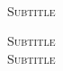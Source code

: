 \begin{center}

  \textsc{\LARGE \pdfTitle}\\[0.1cm]
  \HRule\\[0.25cm]
  \textsc{\Large \pdfAuthor}\\[0.2cm]

  \textsc{\large Subtitle}
  
  \textsc{\footnotesize Subtitle }\\[0.1cm]
  \textsc{\footnotesize Subtitle}\\[0.25cm]
  \HRule\\[0.5cm]


\end{center}

